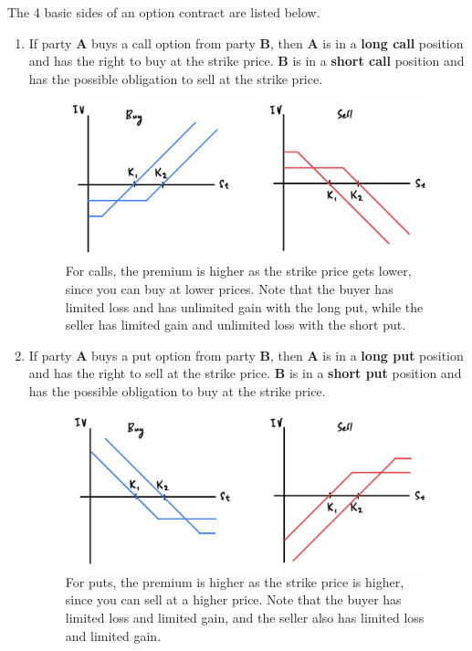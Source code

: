\documentclass{article}
\begin{document}
    \begin{example}
      The 4 basic sides of an option contract are listed below. 
      \begin{enumerate}
        \item If party \textbf{A} buys a call option from party \textbf{B}, then \textbf{A} is in a \textbf{long call} position and has the right to buy at the strike price. \textbf{B} is in a \textbf{short call} position and has the possible obligation to sell at the strike price. 

        \begin{figure}[H]
          \centering 
          \includegraphics[scale=0.4]{img/call_options.png}
          \caption{For calls, the premium is higher as the strike price gets lower, since you can buy at lower prices. Note that the buyer has limited loss and has unlimited gain with the long put, while the seller has limited gain and unlimited loss with the short put.} 
          \label{fig:call_options}
        \end{figure}

        \item If party \textbf{A} buys a put option from party \textbf{B}, then \textbf{A} is in a \textbf{long put} position and has the right to sell at the strike price. \textbf{B} is in a \textbf{short put} position and has the possible obligation to buy at the strike price. 

        \begin{figure}[H]
          \centering 
          \includegraphics[scale=0.4]{img/put_options.png}
          \caption{For puts, the premium is higher as the strike price is higher, since you can sell at a higher price. Note that the buyer has limited loss and limited gain, and the seller also has limited loss and limited gain. } 
          \label{fig:put_options}
        \end{figure}
      \end{enumerate}


\end{example}
\end{document}
